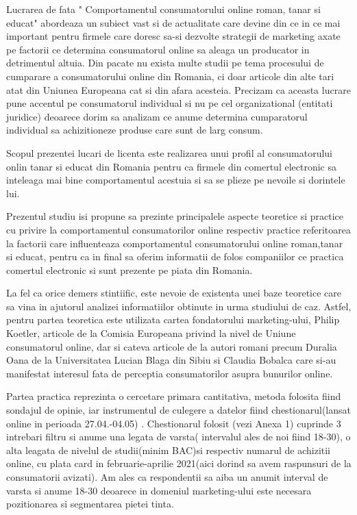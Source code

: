 \documentclass[a4paper, 12pt]{article}
\begin{document}
	\quad\quad Lucrarea de fata " Comportamentul consumatorului online roman, tanar si educat" abordeaza un subiect vast si de actualitate care devine din ce in ce mai important pentru firmele care doresc sa-si dezvolte strategii de marketing axate pe factorii ce determina consumatorul online sa aleaga un producator in detrimentul altuia. Din pacate nu exista multe studii pe tema procesului de cumparare a consumatorului online din Romania, ci doar articole din alte tari atat din Uniunea Europeana cat si din afara acesteia. Precizam ca aceasta lucrare pune accentul pe consumatorul  individual si nu pe cel organizational (entitati juridice) deoarece dorim sa analizam ce anume determina cumparatorul individual sa achizitioneze produse care sunt de larg consum.
	
	\quad Scopul prezentei lucari de licenta este realizarea unui profil al consumatorului onlin tanar si educat din Romania pentru ca firmele din comertul electronic sa inteleaga mai bine comportamentul acestuia si sa se plieze pe nevoile si dorintele lui.
	
	\quad Prezentul studiu isi propune sa prezinte principalele aspecte teoretice si practice cu privire la comportamentul consumatorilor online respectiv practice referitoarea la factorii care influenteaza comportamentul consumatorului online roman,tanar si educat, pentru ca in final sa oferim informatii de folos companiilor ce practica comertul electronic si sunt prezente pe piata din Romania.
	
	\quad La fel ca orice demers stintiific, este nevoie de existenta unei baze teoretice care sa vina in ajutorul analizei informatiilor obtinute in urma studiului de caz. Astfel, pentru partea teoretica este utilizata cartea fondatorului marketing-ului, Philip Koetler, articole de la Comisia Europeana privind la nivel de Uniune consumatorul online, dar si cateva articole de la autori romani precum Duralia Oana de la Universitatea Lucian Blaga din Sibiu si Claudia Bobalca care si-au manifestat interesul fata de perceptia consumatorilor asupra bunurilor online. 
	
	\quad Partea practica reprezinta o cercetare primara cantitativa, metoda folosita fiind sondajul de opinie, iar instrumentul de culegere a datelor fiind chestionarul(lansat online in perioada 27.04.-04.05) .	Chestionarul folosit (vezi Anexa 1) cuprinde 3 intrebari filtru si anume una legata de varsta( intervalul ales de noi fiind 18-30), o alta leagata de nivelul de studii(minim BAC)si respectiv numarul de achizitii online, cu plata card in februarie-aprilie 2021(aici dorind sa avem raspunsuri de la consumatorii avizati). Am ales ca respondentii sa aiba un anumit interval de varsta si anume 18-30 deoarece in domeniul marketing-ului este necesara pozitionarea si segmentarea pietei tinta.
	
\end{document}
